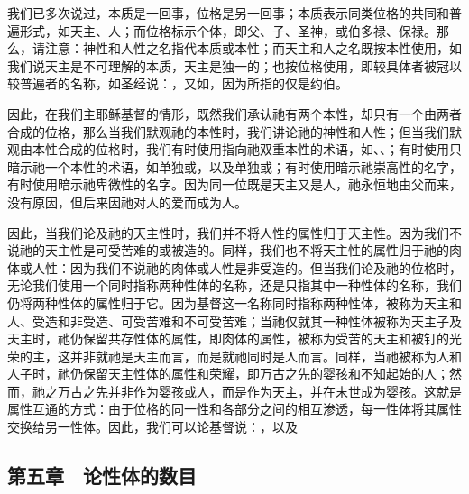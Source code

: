 我们已多次说过，本质是一回事，位格是另一回事；本质表示同类位格的共同和普遍形式，如天主、人；而位格标示个体，即父、子、圣神，或伯多禄、保禄。那么，请注意：神性和人性之名指代本质或本性；而天主和人之名既按本性使用，如我们说天主是不可理解的本质，天主是独一的；也按位格使用，即较具体者被冠以较普遍者的名称，如圣经说：，又如，因为所指的仅是约伯。\par

因此，在我们主耶稣基督的情形，既然我们承认祂有两个本性，却只有一个由两者合成的位格，那么当我们默观祂的本性时，我们讲论祂的神性和人性；但当我们默观由本性合成的位格时，我们有时使用指向祂双重本性的术语，如、、；有时使用只暗示祂一个本性的术语，如单独或，以及单独或；有时使用暗示祂崇高性的名字，有时使用暗示祂卑微性的名字。因为同一位既是天主又是人，祂永恒地由父而来，没有原因，但后来因祂对人的爱而成为人。\par

因此，当我们论及祂的天主性时，我们并不将人性的属性归于天主性。因为我们不说祂的天主性是可受苦难的或被造的。同样，我们也不将天主性的属性归于祂的肉体或人性：因为我们不说祂的肉体或人性是非受造的。但当我们论及祂的位格时，无论我们使用一个同时指称两种性体的名称，还是只指其中一种性体的名称，我们仍将两种性体的属性归于它。因为基督这一名称同时指称两种性体，被称为天主和人、受造和非受造、可受苦难和不可受苦难；当祂仅就其一种性体被称为天主子及天主时，祂仍保留共存性体的属性，即肉体的属性，被称为受苦的天主和被钉的光荣的主，这并非就祂是天主而言，而是就祂同时是人而言。同样，当祂被称为人和人子时，祂仍保留天主性体的属性和荣耀，即万古之先的婴孩和不知起始的人；然而，祂之万古之先并非作为婴孩或人，而是作为天主，并在末世成为婴孩。这就是属性互通的方式：由于位格的同一性和各部分之间的相互渗透，每一性体将其属性交换给另一性体。因此，我们可以论基督说：，以及\par


\subsection{第五章　论性体的数目}

